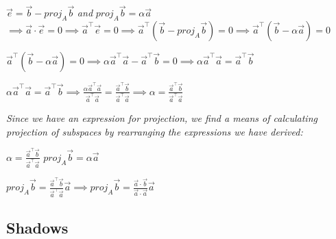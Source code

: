 \documentclass{article}
\newcommand{\vectorproj}[2][]{\textit{proj}_{{#1}}{#2}}
\begin{document}
{%
\begin{center}
$ \vec{e} = \vec{b} - \vectorproj[A]{\vec{b}}$ 
\textit{and} $\vectorproj[A]{\vec{b}} = \alpha\vec{a}$
$\implies \vec{a} \cdot \vec{e} = 0 \implies \vec{a}^\intercal\vec{e} = 0 \implies \vec{a}^\intercal(\vec{b} - \vectorproj[A]{\vec{b}}) = 0 \implies  \vec{a}^\intercal(\vec{b} - \alpha\vec{a}) = 0
$
\end{center}
\begin{center}
	$\vec{a}^\intercal(\vec{b} - \alpha\vec{a}) = 0 \implies \alpha\vec{a}^\intercal\vec{a} - \vec{a}^\intercal\vec{b} = 0 \implies \alpha\vec{a}^\intercal\vec{a} = \vec{a}^\intercal\vec{b}$
\end{center}
\begin{center}
$ \alpha\vec{a}^\intercal\vec{a} = \vec{a}^\intercal\vec{b} \implies \frac{\alpha\vec{a}^\intercal\vec{a}}{\vec{a}^\intercal\vec{a}} = \frac{\vec{a}^\intercal\vec{b}}{\vec{a}^\intercal\vec{a}} \implies \alpha = \frac{\vec{a}^\intercal\vec{b}}{\vec{a}^\intercal\vec{a}}
$
\end{center}

\begin{center}
	\textit{Since we have an expression for projection, we find a means of calculating projection of subspaces by rearranging the expressions we have derived:}
\end{center}
\begin{center}
	$ \alpha = \frac{\vec{a}^\intercal\vec{b}}{\vec{a}^\intercal\vec{a}}$ \hspace*{1cm} $\vectorproj[A]{\vec{b}} = \alpha\vec{a}$
\end{center}
\begin{center}
	$ \vectorproj[A]{\vec{b}} = \frac{\vec{a}^\intercal\vec{b}}{\vec{a}^\intercal\vec{a}} \vec{a} \implies \vectorproj[A]{\vec{b}} =\frac{\vec{a} \cdot \vec{b}}{\vec{a} \cdot \vec{a}} \vec{a}$

\end{center}

\clearpage
\subsection{Shadows}

}
\end{document}
